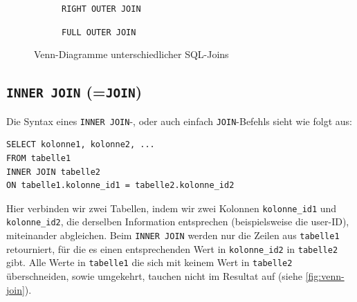 \begin{figure}[htbp]
  \begin{subfigure}[b]{0.45\textwidth}
    \centering
    \caption{\lstinline|RIGHT OUTER JOIN|}
  \end{subfigure}
  \hfill
  \begin{subfigure}[b]{0.45\textwidth}
    \centering
    \caption{\lstinline|FULL OUTER JOIN|}
  \end{subfigure}
  \caption{Venn-Diagramme unterschiedlicher SQL-Joins}
  \label{fig:venn-joins}
\end{figure}


\subsection{\texorpdfstring{\lstinline|INNER JOIN| (=\lstinline|JOIN|)}{INNER JOIN (=JOIN)}}
Die Syntax eines \lstinline|INNER JOIN|-, oder auch einfach \lstinline|JOIN|-Befehls sieht wie folgt aus:

\begin{lstlisting}
SELECT kolonne1, kolonne2, ...
FROM tabelle1
INNER JOIN tabelle2
ON tabelle1.kolonne_id1 = tabelle2.kolonne_id2
\end{lstlisting}
Hier verbinden wir zwei Tabellen, indem wir zwei Kolonnen \texttt{kolonne\_id1} und \texttt{kolonne\_id2}, die derselben Information entsprechen (beispielsweise die user-ID), miteinander abgleichen. Beim \lstinline|INNER JOIN| werden nur die Zeilen aus \texttt{tabelle1} retourniert, für die es einen entsprechenden Wert in \texttt{kolonne\_id2} in \texttt{tabelle2} gibt. Alle Werte in \texttt{tabelle1} die sich mit keinem Wert in \texttt{tabelle2} überschneiden, sowie umgekehrt, tauchen nicht im Resultat auf (siehe \cref{fig:venn-join}).

